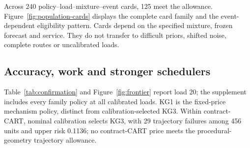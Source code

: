Across 240 policy--load--mixture--event cards, 125 meet the allowance. Figure~\ref{fig:population-cards} displays the complete card family and the event-dependent eligibility pattern. Cards depend on the specified mixture, frozen forecast and service. They do not transfer to difficult priors, shifted noise, complete routes or uncalibrated loads.


\subsection{Accuracy, work and stronger schedulers}
Table~\ref{tab:confirmation} and Figure~\ref{fig:frontier} report load 20; the supplement includes every family policy at all calibrated loads. KG1 is the fixed-price mechanism policy, distinct from calibration-selected KG3. Within contract-CART, nominal calibration selects KG3, with 29 trajectory failures among 456 units and upper risk 0.1136; no contract-CART price meets the procedural-geometry trajectory allowance.
